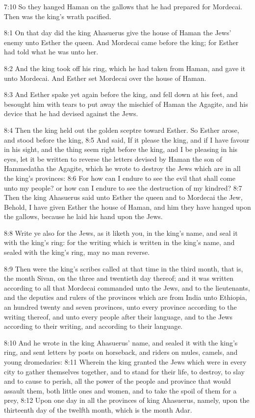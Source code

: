7:10 So they hanged Haman on the gallows that he had prepared for
Mordecai. Then was the king's wrath pacified.

8:1 On that day did the king Ahasuerus give the house of Haman the
Jews' enemy unto Esther the queen. And Mordecai came before the king;
for Esther had told what he was unto her.

8:2 And the king took off his ring, which he had taken from Haman, and
gave it unto Mordecai. And Esther set Mordecai over the house of
Haman.

8:3 And Esther spake yet again before the king, and fell down at his
feet, and besought him with tears to put away the mischief of Haman
the Agagite, and his device that he had devised against the Jews.

8:4 Then the king held out the golden sceptre toward Esther. So Esther
arose, and stood before the king, 8:5 And said, If it please the king,
and if I have favour in his sight, and the thing seem right before the
king, and I be pleasing in his eyes, let it be written to reverse the
letters devised by Haman the son of Hammedatha the Agagite, which he
wrote to destroy the Jews which are in all the king's provinces: 8:6
For how can I endure to see the evil that shall come unto my people?
or how can I endure to see the destruction of my kindred?  8:7 Then
the king Ahasuerus said unto Esther the queen and to Mordecai the Jew,
Behold, I have given Esther the house of Haman, and him they have
hanged upon the gallows, because he laid his hand upon the Jews.

8:8 Write ye also for the Jews, as it liketh you, in the king's name,
and seal it with the king's ring: for the writing which is written in
the king's name, and sealed with the king's ring, may no man reverse.

8:9 Then were the king's scribes called at that time in the third
month, that is, the month Sivan, on the three and twentieth day
thereof; and it was written according to all that Mordecai commanded
unto the Jews, and to the lieutenants, and the deputies and rulers of
the provinces which are from India unto Ethiopia, an hundred twenty
and seven provinces, unto every province according to the writing
thereof, and unto every people after their language, and to the Jews
according to their writing, and according to their language.

8:10 And he wrote in the king Ahasuerus' name, and sealed it with the
king's ring, and sent letters by posts on horseback, and riders on
mules, camels, and young dromedaries: 8:11 Wherein the king granted
the Jews which were in every city to gather themselves together, and
to stand for their life, to destroy, to slay and to cause to perish,
all the power of the people and province that would assault them, both
little ones and women, and to take the spoil of them for a prey, 8:12
Upon one day in all the provinces of king Ahasuerus, namely, upon the
thirteenth day of the twelfth month, which is the month Adar.

